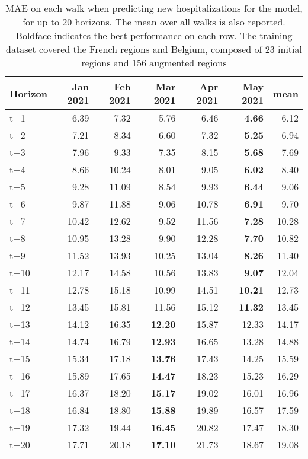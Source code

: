 \begin{table}[H]
\centering
\caption{MAE on each walk when predicting new hospitalizations for the model, for up to 20 horizons. The mean over all walks is also reported. Boldface indicates the best performance on each row. The training dataset covered the French regions and Belgium, composed of 23 initial regions and 156 augmented regions }
\label{tab:MAE_walk_custom_linear_regression}
\begin{tabular}{lrrrrrr}
\toprule
Horizon &  Jan 2021 &  Feb 2021 &  Mar 2021 &  Apr 2021 &  May 2021 &  mean \\
\midrule
t+1  & 6.39  & 7.32  & 5.76  & 6.46  & \textbf{4.66}  & 6.12  \\
t+2  & 7.21  & 8.34  & 6.60  & 7.32  & \textbf{5.25}  & 6.94  \\
t+3  & 7.96  & 9.33  & 7.35  & 8.15  & \textbf{5.68}  & 7.69  \\
t+4  & 8.66  & 10.24  & 8.01  & 9.05  & \textbf{6.02}  & 8.40  \\
t+5  & 9.28  & 11.09  & 8.54  & 9.93  & \textbf{6.44}  & 9.06  \\
t+6  & 9.87  & 11.88  & 9.06  & 10.78  & \textbf{6.91}  & 9.70  \\
t+7  & 10.42  & 12.62  & 9.52  & 11.56  & \textbf{7.28}  & 10.28  \\
t+8  & 10.95  & 13.28  & 9.90  & 12.28  & \textbf{7.70}  & 10.82  \\
t+9  & 11.52  & 13.93  & 10.25  & 13.04  & \textbf{8.26}  & 11.40  \\
t+10  & 12.17  & 14.58  & 10.56  & 13.83  & \textbf{9.07}  & 12.04  \\
t+11  & 12.78  & 15.18  & 10.99  & 14.51  & \textbf{10.21}  & 12.73  \\
t+12  & 13.45  & 15.81  & 11.56  & 15.12  & \textbf{11.32}  & 13.45  \\
t+13  & 14.12  & 16.35  & \textbf{12.20}  & 15.87  & 12.33  & 14.17  \\
t+14  & 14.74  & 16.79  & \textbf{12.93}  & 16.65  & 13.28  & 14.88  \\
t+15  & 15.34  & 17.18  & \textbf{13.76}  & 17.43  & 14.25  & 15.59  \\
t+16  & 15.89  & 17.65  & \textbf{14.47}  & 18.23  & 15.23  & 16.29  \\
t+17  & 16.37  & 18.20  & \textbf{15.17}  & 19.02  & 16.01  & 16.96  \\
t+18  & 16.84  & 18.80  & \textbf{15.88}  & 19.89  & 16.57  & 17.59  \\
t+19  & 17.32  & 19.44  & \textbf{16.45}  & 20.82  & 17.47  & 18.30  \\
t+20  & 17.71  & 20.18  & \textbf{17.10}  & 21.73  & 18.67  & 19.08  \\

\bottomrule
\end{tabular}
\end{table}
